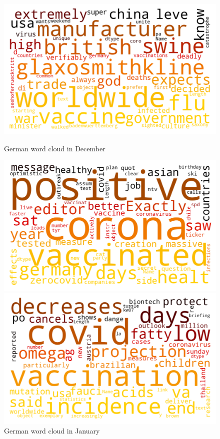 \begin{landscape}
\begin{figure}[!htb]
  \includegraphics[width=\linewidth]{December de word cloud.png}
  \caption{German word cloud in December}\label{fig:decemberde}
\endminipage\hfill
{}
  \includegraphics[width=\linewidth]{January de word cloud.png}
  \caption{German word cloud in January}\label{fig:januaryde}
\endminipage\hfill
{}
  \includegraphics[width=\linewidth]{February de word cloud.png}

\end{figure}
\end{landscape}
